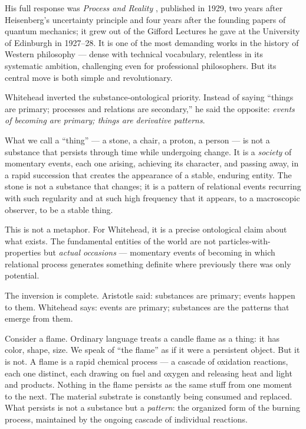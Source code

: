 His full response was \textit{Process and Reality} \citep{Whitehead1929}, published in 1929, two years after Heisenberg's uncertainty principle and four years after the founding papers of quantum mechanics; it grew out of the Gifford Lectures he gave at the University of Edinburgh in 1927--28. It is one of the most demanding works in the history of Western philosophy --- dense with technical vocabulary, relentless in its systematic ambition, challenging even for professional philosophers. But its central move is both simple and revolutionary.

Whitehead inverted the substance-ontological priority. Instead of saying ``things are primary; processes and relations are secondary,'' he said the opposite: \emph{events of becoming are primary; things are derivative patterns}.

What we call a ``thing'' --- a stone, a chair, a proton, a person --- is not a substance that persists through time while undergoing change. It is a \emph{society} of momentary events, each one arising, achieving its character, and passing away, in a rapid succession that creates the appearance of a stable, enduring entity. The stone is not a substance that changes; it is a pattern of relational events recurring with such regularity and at such high frequency that it appears, to a macroscopic observer, to be a stable thing.

This is not a metaphor. For Whitehead, it is a precise ontological claim about what exists. The fundamental entities of the world are not particles-with-properties but \emph{actual occasions} --- momentary events of becoming in which relational process generates something definite where previously there was only potential.

The inversion is complete. Aristotle said: substances are primary; events happen to them. Whitehead says: events are primary; substances are the patterns that emerge from them.

Consider a flame. Ordinary language treats a candle flame as a thing: it has color, shape, size. We speak of ``the flame'' as if it were a persistent object. But it is not. A flame is a rapid chemical process --- a cascade of oxidation reactions, each one distinct, each drawing on fuel and oxygen and releasing heat and light and products. Nothing in the flame persists as the same stuff from one moment to the next. The material substrate is constantly being consumed and replaced. What persists is not a substance but a \emph{pattern}: the organized form of the burning process, maintained by the ongoing cascade of individual reactions.

